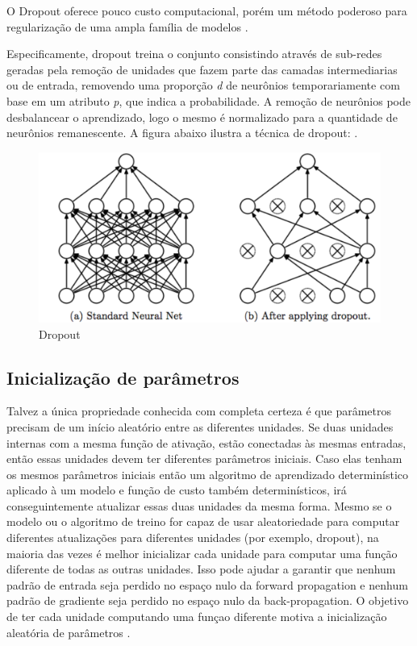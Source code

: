 \documentclass[12pt]{article}
\begin{document}
O Dropout oferece pouco custo computacional, porém um método poderoso para regularização de uma ampla família de modelos \cite{DBLP:journals/corr/abs-1207-0580}.

Especificamente, dropout treina o conjunto consistindo através de sub-redes geradas pela remoção de unidades que fazem parte das camadas intermediarias ou de entrada, removendo uma proporção \textit{d} de neurônios temporariamente com base em um atributo \textit{p}, que indica a probabilidade. A remoção de neurônios pode desbalancear o aprendizado, logo o mesmo é normalizado para a quantidade de neurônios remanescente. A figura abaixo ilustra a técnica de dropout: \cite{Goodfellow-et-al-2016}.

\begin{figure}[!htb]
\centering
\includegraphics[width=.8\textwidth]{images/dropout.png}
\caption{Dropout}
\label{fig:dropout}
\end{figure}

\subsection{Inicialização de parâmetros}

Talvez a única propriedade conhecida com completa certeza é que parâmetros precisam de um início aleatório entre as diferentes unidades. Se duas unidades internas com a mesma função de ativação, estão conectadas às mesmas entradas, então essas unidades devem ter diferentes parâmetros iniciais. Caso elas tenham os mesmos parâmetros iniciais então um algoritmo de aprendizado determinístico aplicado à um modelo e função de custo também determinísticos, irá conseguintemente atualizar essas duas unidades da mesma forma. Mesmo se o modelo ou o algoritmo de treino for capaz de usar aleatoriedade para computar diferentes atualizações para diferentes unidades (por exemplo, dropout), na maioria das vezes é melhor inicializar cada unidade para computar uma função diferente de todas as outras unidades. Isso pode ajudar a garantir que nenhum padrão de entrada seja perdido no espaço nulo da forward propagation e nenhum padrão de gradiente seja perdido no espaço nulo da back-propagation. O objetivo de ter cada unidade computando uma funçao diferente motiva a inicialização aleatória de parâmetros \cite{Goodfellow-et-al-2016}.
\end{document}
